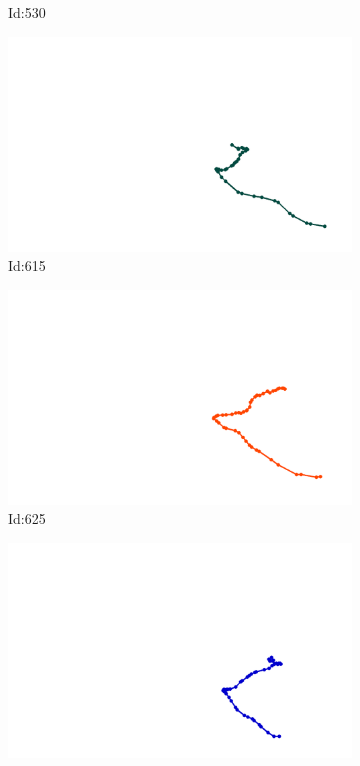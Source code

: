 \documentclass[12pt,twoside]{report}
\begin{document}
\begin{figure}
\begin{subfigure}[b]{0.20\textwidth}
\caption{Id:530}
\end{subfigure}
\begin{subfigure}[b]{0.20\textwidth}
\centering
\includegraphics[width=\textwidth]{../../trajectories/615.png}
\caption{Id:615}
\end{subfigure}
\begin{subfigure}[b]{0.20\textwidth}
\centering
\includegraphics[width=\textwidth]{../../trajectories/625.png}
\caption{Id:625}
\end{subfigure}
\begin{subfigure}[b]{0.20\textwidth}
\centering
\includegraphics[width=\textwidth]{../../trajectories/630.png}

\end{subfigure}
\end{figure}
\end{document}
